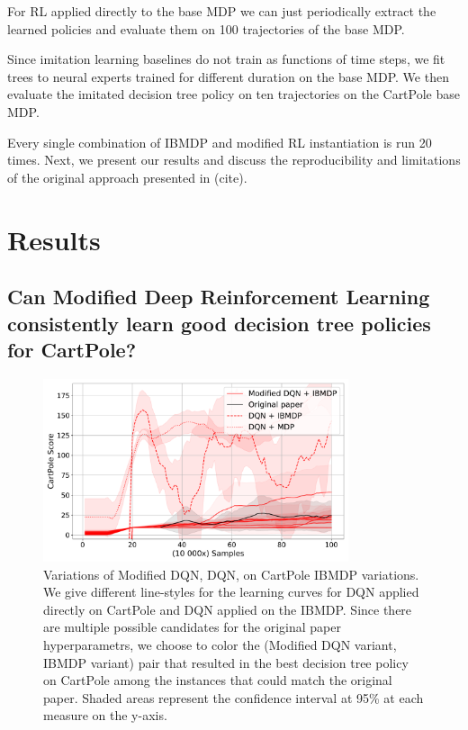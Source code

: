 For RL applied directly to the base MDP we can just periodically extract the learned policies and evaluate them on 100 trajectories of the base MDP.

Since imitation learning baselines do not train as functions of time steps, we fit trees to neural experts trained for different duration on the base MDP. 
We then evaluate the imitated decision tree policy on ten trajectories on the CartPole base MDP.

Every single combination of IBMDP and modified RL instantiation is run 20 times.
Next, we present our results and discuss the reproducibility and limitations of the original approach presented in (cite).

\section{Results}

\subsection{Can Modified Deep Reinforcement Learning consistently learn good decision tree policies for CartPole?}

\begin{figure}
    \centering
    \includegraphics[width=0.8\textwidth]{images/images_part1/dqn.pdf}
    \caption{Variations of Modified DQN, DQN, on CartPole IBMDP variations. We give different line-styles for the learning curves for DQN applied directly on CartPole and DQN applied on the IBMDP.
    Since there are multiple possible candidates for the original paper hyperparametrs, we choose to color the (Modified DQN variant, IBMDP variant) pair that resulted in the best decision tree policy on CartPole among the instances that could match the original paper.
    Shaded areas represent the confidence interval at 95\% at each measure on the y-axis.}
\end{figure}

